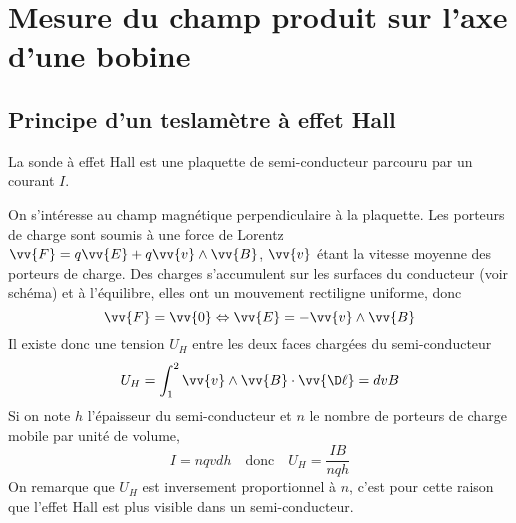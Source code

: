 \documentclass{tp}
\begin{document}
\section{Mesure du champ produit sur l'axe d'une bobine}%
\label{sec:mesure_du_champ_produit_sur_l_axe_d_une_bobine}

\subsection{Principe d'un teslamètre à effet Hall}%
\label{sub:principe_d_un_teslametre_a_effet_hall}

La sonde à effet Hall est une plaquette de semi-conducteur parcouru par un courant $I$. 

On s'intéresse au champ magnétique perpendiculaire à la plaquette. Les porteurs de charge sont soumis à une force de Lorentz $\vv{F} = q\vv{E} + q\vv{v}\wedge \vv{B}$, $\vv{v}$ étant la vitesse moyenne des porteurs de charge. Des charges s'accumulent sur les surfaces du conducteur (voir schéma) et à l'équilibre, elles ont un mouvement rectiligne uniforme, donc 
\begin{equation}
  \vv{F}=\vv{0} \Leftrightarrow \vv{E} = - \vv{v}\wedge \vv{B}
\end{equation}
Il existe donc une tension $U_H$ entre les deux faces chargées du semi-conducteur
\begin{equation}
  U_H = \int_1^2 \vv{v}\wedge \vv{B}\cdot \vv{\D \ell} = dvB
\end{equation} 
Si on note $h$ l'épaisseur du semi-conducteur et $n$ le nombre de porteurs de charge mobile par unité de volume, 
\begin{equation}
  I = nqvdh \quad \text{donc} \quad U_H = \frac{IB}{nqh}
\end{equation}
On remarque que $U_H$ est inversement proportionnel à $n$, c'est pour cette raison que l'effet Hall est plus visible dans un semi-conducteur.
\end{document}
